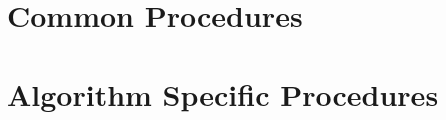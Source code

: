 
\section{Common Procedures}
\begin{spacing}{1}
\begin{alltt}



















\end{alltt}
\end{spacing}

\section{Algorithm Specific Procedures}
\begin{spacing}{1}
\begin{alltt}



\end{alltt}
\end{spacing}
